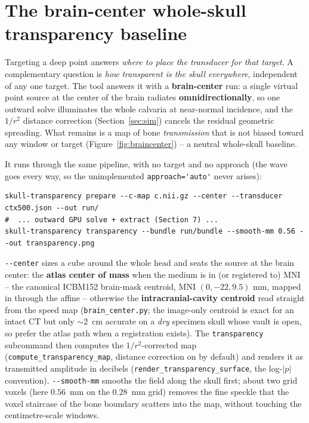 \documentclass[10pt]{article}
\newcommand{\code}[1]{\lstinline[basicstyle=\ttfamily]|#1|}
\begin{document}
\section{The brain-center whole-skull transparency baseline}\label{sec:braincenter}

Targeting a deep point answers \emph{where to place the transducer for that target}. A
complementary question is \emph{how transparent is the skull everywhere}, independent of
any one target. The tool answers it with a \textbf{brain-center} run: a single virtual
point source at the center of the brain radiates \textbf{omnidirectionally}, so one
outward solve illuminates the whole calvaria at near-normal incidence, and the $1/r^2$
distance correction (Section~\ref{sec:sim}) cancels the residual geometric spreading.
What remains is a map of bone \emph{transmission} that is not biased toward any window or
target (Figure~\ref{fig:braincenter}) -- a neutral whole-skull baseline.

It runs through the same pipeline, with no target and no approach (the wave goes every
way, so the unimplemented \code{approach='auto'} never arises):
\begin{lstlisting}[style=sh]
skull-transparency prepare --c-map c.nii.gz --center --transducer ctx500.json --out run/
#  ... outward GPU solve + extract (Section 7) ...
skull-transparency transparency --bundle run/bundle --smooth-mm 0.56 --out transparency.png
\end{lstlisting}
\code{--center} sizes a cube around the whole head and seats the source at the brain
center: the \textbf{atlas center of mass} when the medium is in (or registered to) MNI --
the canonical ICBM152 brain-mask centroid, MNI $(0,-22,9.5)$ mm, mapped in through the
affine -- otherwise the \textbf{intracranial-cavity centroid} read straight from the
speed map (\code{brain_center.py}; the image-only centroid is exact for an intact CT but
only $\sim$2~cm accurate on a \emph{dry} specimen skull whose vault is open, so prefer the
atlas path when a registration exists). The \code{transparency} subcommand then computes
the $1/r^2$-corrected map (\code{compute_transparency_map}, distance correction on by
default) and renders it as transmitted amplitude in decibels
(\code{render_transparency_surface}, the log-$|p|$ convention). \code{--smooth-mm} smooths
the field along the skull first; about two grid voxels (here $0.56$~mm on the $0.28$~mm
grid) removes the fine speckle that the voxel staircase of the bone boundary scatters
into the map, without touching the centimetre-scale windows.
\end{document}
